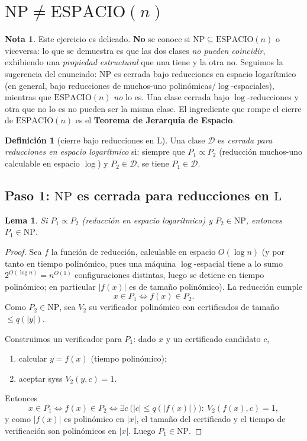 \documentclass[11pt,a4paper]{article}
\theoremstyle{plain}
\newtheorem{lema}{Lema}
\theoremstyle{definition}
\newtheorem{definicion}{Definici\'on}
\newtheorem*{nota}{Nota}
\newcommand{\NP}{\mathrm{NP}}
\newcommand{\Lclass}{\mathrm{L}}
\newcommand{\SPACE}{\mathrm{ESPACIO}}
\newcommand{\reduce}{\propto}
\begin{document}
\section{$\NP\neq\SPACE(n)$}

\begin{nota}
Este ejercicio es delicado. \textbf{No} se conoce si $\NP\subseteq\SPACE(n)$ o
viceversa: lo que se demuestra es que las dos clases \emph{no pueden coincidir},
exhibiendo una \emph{propiedad estructural} que una tiene y la otra no. Seguimos la
sugerencia del enunciado: $\NP$ es cerrada bajo reducciones en espacio logar\'itmico
(en general, bajo reducciones de muchos-uno polin\'omicas/$\log$-espaciales),
mientras que $\SPACE(n)$ \emph{no} lo es. Una clase cerrada bajo $\log$-reducciones y
otra que no lo es no pueden ser la misma clase. El ingrediente que rompe el cierre de
$\SPACE(n)$ es el \textbf{Teorema de Jerarqu\'ia de Espacio}.
\end{nota}

\begin{definicion}[cierre bajo reducciones en $\Lclass$]
Una clase $\mathcal{D}$ es \emph{cerrada para reducciones en espacio logar\'itmico}
si: siempre que $P_1\reduce P_2$ (reducci\'on muchos-uno calculable en espacio
$\log$) y $P_2\in\mathcal{D}$, se tiene $P_1\in\mathcal{D}$.
\end{definicion}

\subsection*{Paso 1: $\NP$ es cerrada para reducciones en $\Lclass$}

\begin{lema}
Si $P_1\reduce P_2$ (reducci\'on en espacio logar\'itmico) y $P_2\in\NP$, entonces
$P_1\in\NP$.
\end{lema}

\begin{proof}
Sea $f$ la funci\'on de reducci\'on, calculable en espacio $O(\log n)$ (y por tanto en
tiempo polin\'omico, pues una m\'aquina $\log$-espacial tiene a lo sumo
$2^{O(\log n)}=n^{O(1)}$ configuraciones distintas, luego se detiene en tiempo
polin\'omico; en particular $|f(x)|$ es de tama\~no polin\'omico). La reducci\'on
cumple
\[
x\in P_1 \iff f(x)\in P_2 .
\]
Como $P_2\in\NP$, sea $V_2$ su verificador polin\'omico con certificados de tama\~no
$\le q(|y|)$.

Construimos un verificador para $P_1$: dado $x$ y un certificado candidato $c$,
\begin{enumerate}[nosep]
  \item calcular $y=f(x)$ (tiempo polin\'omico);
  \item aceptar syss $V_2(y,c)=1$.
\end{enumerate}
Entonces
\[
x\in P_1 \iff f(x)\in P_2 \iff \exists c\ \big(|c|\le q(|f(x)|)\big):\ V_2(f(x),c)=1,
\]
y como $|f(x)|$ es polin\'omico en $|x|$, el tama\~no del certificado y el tiempo de
verificaci\'on son polin\'omicos en $|x|$. Luego $P_1\in\NP$.
\end{proof}
\end{document}
